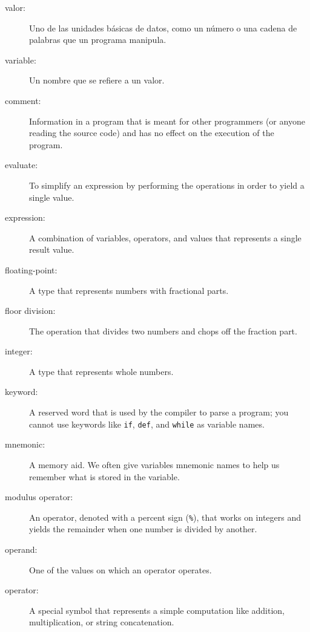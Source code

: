 \begin{ex}
\begin{description}
\item[valor:]  Uno de las unidades b\'asicas de datos, como un n\'umero o una cadena de palabras que un programa manipula.

\item[variable:]  Un nombre que se refiere a un valor.

\item[comment:]  Information in a program that is meant for other
programmers (or anyone reading the source code) and has no effect on the
execution of the program.

\item[evaluate:]  To simplify an expression by performing the operations
in order to yield a single value.

\item[expression:]  A combination of variables, operators, and values that
represents a single result value.

\item[floating-point:] A type that represents numbers with fractional
parts.

\item[floor division:] The operation that divides two numbers and chops off
the fraction part.

\item[integer:] A type that represents whole numbers.

\item[keyword:]  A reserved word that is used by the compiler to parse a
program; you cannot use keywords like {\tt if}, {\tt  def}, and {\tt while} as
variable names.

\item[mnemonic:] A memory aid. We often give variables mnemonic names
to help us remember what is stored in the variable.

\item[modulus operator:]  An operator, denoted with a percent sign
({\tt \%}), that works on integers and yields the remainder when one
number is divided by another.

\item[operand:]  One of the values on which an operator operates.

\item[operator:]  A special symbol that represents a simple computation like
addition, multiplication, or string concatenation.


\end{description}
\end{ex}
